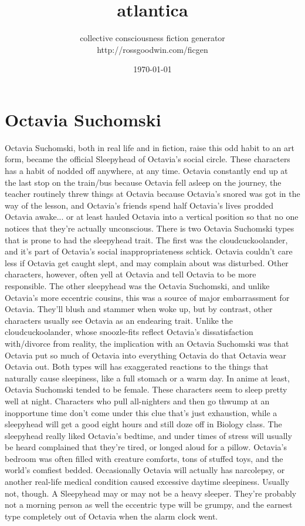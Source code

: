 \documentclass[12pt]{book}
\title{atlantica}
\author{collective consciousness fiction generator\\http://rossgoodwin.com/ficgen}
\date{\today}
\begin{document}
\maketitle



\chapter{Octavia Suchomski}

Octavia Suchomski, both in real life and in fiction, raise this odd habit to an art form, became the official Sleepyhead of Octavia's social circle. These characters has a habit of nodded off anywhere, at any time. Octavia constantly end up at the last stop on the train/bus because Octavia fell asleep on the journey, the teacher routinely threw things at Octavia because Octavia's snored was got in the way of the lesson, and Octavia's friends spend half Octavia's lives prodded Octavia awake... or at least hauled Octavia into a vertical position so that no one notices that they're actually unconscious. There is two Octavia Suchomski types that is prone to had the sleepyhead trait. The first was the cloudcuckoolander, and it's part of Octavia's social inappropriateness schtick. Octavia couldn't care less if Octavia get caught slept, and may complain about was disturbed. Other characters, however, often yell at Octavia and tell Octavia to be more responsible. The other sleepyhead was the Octavia Suchomski, and unlike Octavia's more eccentric cousins, this was a source of major embarrassment for Octavia. They'll blush and stammer when woke up, but by contrast, other characters usually see Octavia as an endearing trait. Unlike the cloudcuckoolander, whose snoozle-fits reflect Octavia's dissatisfaction with/divorce from reality, the implication with an Octavia Suchomski was that Octavia put so much of Octavia into everything Octavia do that Octavia wear Octavia out. Both types will has exaggerated reactions to the things that naturally cause sleepiness, like a full stomach or a warm day. In anime at least, Octavia Suchomski tended to be female. These characters seem to sleep pretty well at night. Characters who pull all-nighters and then go thwump at an inopportune time don't come under this clue  that's just exhaustion, while a sleepyhead will get a good eight hours and still doze off in Biology class. The sleepyhead really liked Octavia's bedtime, and under times of stress will usually be heard complained that they're tired, or longed aloud for a pillow. Octavia's bedroom was often filled with creature comforts, tons of stuffed toys, and the world's comfiest bedded. Occasionally Octavia will actually has narcolepsy, or another real-life medical condition caused excessive daytime sleepiness. Usually not, though. A Sleepyhead may or may not be a heavy sleeper. They're probably not a morning person as well  the eccentric type will be grumpy, and the earnest type completely out of Octavia when the alarm clock went.
\end{document}
